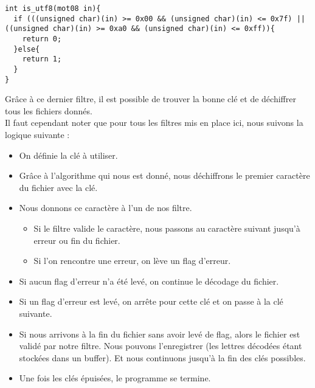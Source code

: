 \begin{lstlisting}[style=customc]
 int is_utf8(mot08 in){
  if (((unsigned char)(in) >= 0x00 && (unsigned char)(in) <= 0x7f) || ((unsigned char)(in) >= 0xa0 && (unsigned char)(in) <= 0xff)){
    return 0;
  }else{
    return 1;
  }
}
\end{lstlisting}
Grâce à ce dernier filtre, il est possible de trouver la bonne clé et de déchiffrer tous les fichiers donnés.\\
Il faut cependant noter que pour tous les filtres mis en place ici, nous suivons la logique suivante :
\begin{itemize}
 \item On définie la clé à utiliser.
 \item Grâce à l'algorithme qui nous est donné, nous déchiffrons le premier caractère du fichier avec la clé.
 \item Nous donnons ce caractère à l'un de nos filtre.
 \begin{itemize}
  \item Si le filtre valide le caractère, nous passons au caractère suivant jusqu'à erreur ou fin du fichier.
  \item Si l'on rencontre une erreur, on lève un flag d'erreur.
 \end{itemize}
 \item Si aucun flag d'erreur n'a été levé, on continue le décodage du fichier.
 \item Si un flag d'erreur est levé, on arrête pour cette clé et on passe à la clé suivante.
 \item Si nous arrivons à la fin du fichier sans avoir levé de flag, alors le fichier est validé par notre filtre. Nous pouvons l'enregistrer (les lettres décodées étant stockées dans un buffer). Et nous continuons jusqu'à la fin des clés possibles.
 \item Une fois les clés épuisées, le programme se termine.
\end{itemize}
